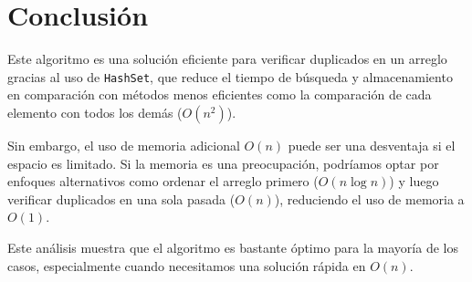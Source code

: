 \documentclass{article}
\begin{document}
	\section{Conclusión}
	Este algoritmo es una solución eficiente para verificar duplicados en un arreglo gracias al uso de \texttt{HashSet}, que reduce el tiempo de búsqueda y almacenamiento en comparación con métodos menos eficientes como la comparación de cada elemento con todos los demás ($O(n^2)$).
	
	Sin embargo, el uso de memoria adicional $O(n)$ puede ser una desventaja si el espacio es limitado. Si la memoria es una preocupación, podríamos optar por enfoques alternativos como ordenar el arreglo primero ($O(n \log n)$) y luego verificar duplicados en una sola pasada ($O(n)$), reduciendo el uso de memoria a $O(1)$.
	
	Este análisis muestra que el algoritmo es bastante óptimo para la mayoría de los casos, especialmente cuando necesitamos una solución rápida en $O(n)$.
	
	
	
	
\end{document}
